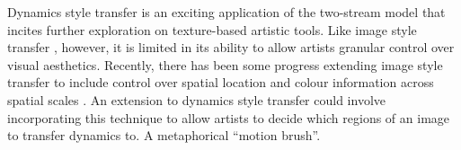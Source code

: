 Dynamics style transfer is an exciting application of the two-stream model that incites further exploration on texture-based artistic tools. Like image style transfer \cite{gatys2016image}, however, it is limited in its ability to allow artists granular control over visual aesthetics. Recently, there has been some progress extending image style transfer to include control over spatial location and colour information across spatial scales \cite{gatys2017}. An extension to dynamics style transfer could involve incorporating this technique to allow artists to decide which regions of an image to transfer dynamics to. A metaphorical ``motion brush''.
